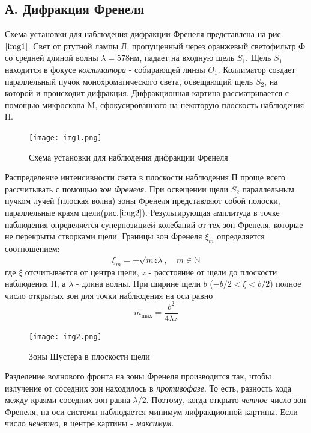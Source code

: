 \documentclass[a4paper,12pt]{article}
\begin{document}
\subsection{А. Дифракция Френеля}


Схема установки для наблюдения дифракции Френеля представлена на рис. $\ref{img1}$. Свет от ртутной лампы Л, пропущенный через оранжевый светофильтр Ф со средней длиной волны $\lambda=578\text{нм}$, падает на входную щель $S_1$. Щель $S_1$ находится в фокусе \textit{коллиматора} - собирающей линзы $O_1$. Коллиматор создает параллельный пучок монохроматического света, освещающий щель $S_2$, на которой и происходит дифракция. Дифракционная картина рассматривается с помощью микроскопа M, сфокусированного на некоторую плоскость наблюдения П.

\begin{figure}[h]
\centering
\texttt{[image: img1.png]}
\caption{Схема установки для наблюдения дифракции Френеля}
\label{img1}
\end{figure}

Распределение интенсивности света в плоскости наблюдения П проще всего рассчитывать с помощью \textit{зон Френеля}. При освещении щели $S_2$ параллельным пучком лучей (плоская волна) зоны Френеля представляют собой полоски, параллельные краям щели(рис.$\ref{img2}$). Результирующая амплитуда в точке наблюдения определяется суперпозицией колебаний от тех зон Френеля, которые не перекрыты створками щели. Границы зон Френеля $\xi_m$ определяется соотношением:
\begin{equation}
    \xi_m=\pm \sqrt{mz\lambda}, \quad m \in \mathbb{N}
\end{equation}
где $\xi$ отсчитывается от центра щели, $z$ - расстояние от щели до плоскости наблюдения П, а $\lambda$ - длина волны. При ширине щели $b$ ($-b/2 <\xi<b/2$) полное число открытых зон для точки наблюдения на оси равно
\begin{equation}
    m_\text{max} = \frac{b^2}{4\lambda z}
\end{equation}

\begin{figure}[h]
\centering
\texttt{[image: img2.png]}
\caption{Зоны Шустера в плоскости щели}
\label{img2}
\end{figure}

Разделение волнового фронта на зоны Френеля производится так, чтобы излучение от соседних зон находилось в \textit{противофазе}. То есть, разность хода между краями соседних зон равна $\lambda/2$. Поэтому, когда открыто \textit{четное} число зон Френеля, на оси системы наблюдается $\textit{минимум}$ лифракционной картины. Если число \textit{нечетно}, в центре картины - \textit{максимум}.
\end{document}
